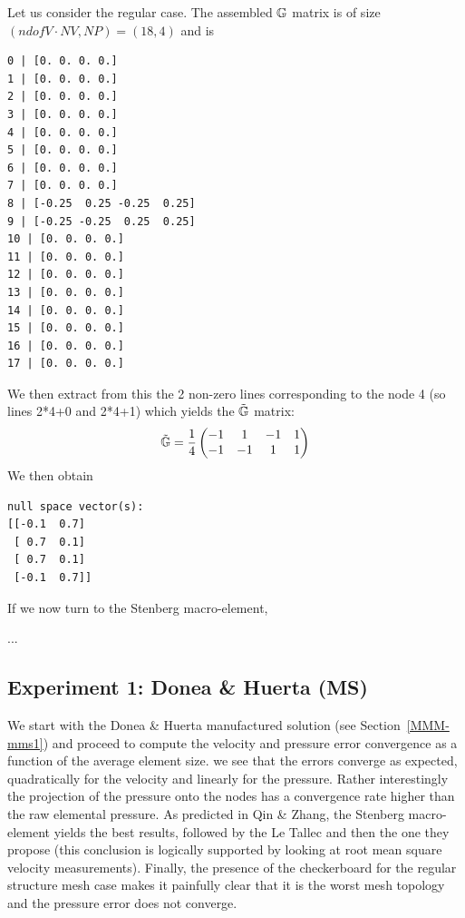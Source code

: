Let us consider the regular case. 
The assembled ${\mathbb{G}}$ matrix is of size $(ndofV \cdot NV, NP)=(18,4)$ and is 
\begin{verbatim}
0 | [0. 0. 0. 0.]
1 | [0. 0. 0. 0.]
2 | [0. 0. 0. 0.]
3 | [0. 0. 0. 0.]
4 | [0. 0. 0. 0.]
5 | [0. 0. 0. 0.]
6 | [0. 0. 0. 0.]
7 | [0. 0. 0. 0.]
8 | [-0.25  0.25 -0.25  0.25]
9 | [-0.25 -0.25  0.25  0.25]
10 | [0. 0. 0. 0.]
11 | [0. 0. 0. 0.]
12 | [0. 0. 0. 0.]
13 | [0. 0. 0. 0.]
14 | [0. 0. 0. 0.]
15 | [0. 0. 0. 0.]
16 | [0. 0. 0. 0.]
17 | [0. 0. 0. 0.]
\end{verbatim}
We then extract from this the 2 non-zero lines 
corresponding to the node 4 (so lines 2*4+0 and 2*4+1)
which yields the $\tilde{{\mathbb{G}}}$ matrix:
\[
\tilde{{\mathbb{G}}}=
\frac14
\begin{pmatrix}
-1 &1 &-1 &1 \\
-1 &-1& 1 &1
\end{pmatrix}
\]
We then obtain 
\begin{verbatim}
null space vector(s):
[[-0.1  0.7]
 [ 0.7  0.1]
 [ 0.7  0.1]
 [-0.1  0.7]]
\end{verbatim}

If we now turn to the Stenberg macro-element, 

...















\newpage
\subsection*{Experiment 1: Donea \& Huerta (MS)}

We start with the Donea \& Huerta manufactured solution (see Section~\ref{MMM-mms1}) and 
proceed to compute the velocity and pressure error convergence as a function of the 
average element size.
we see that the errors converge as expected, quadratically for the velocity and linearly for the pressure.
Rather interestingly the projection of the pressure onto the nodes has a convergence rate 
higher than the raw elemental pressure. As predicted in Qin \& Zhang, the Stenberg macro-element 
yields the best results, followed by the Le Tallec and then the one they propose (this conclusion 
is logically supported by looking at root mean square velocity measurements). 
Finally, the presence of the checkerboard for the regular structure mesh case
makes it painfully clear that it is the worst mesh topology 
and the pressure error does not converge.  


